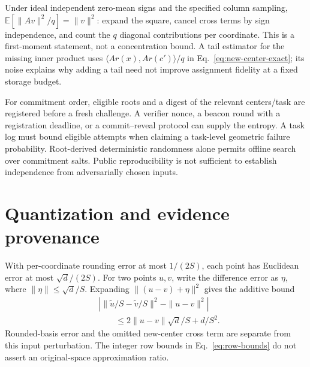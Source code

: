 \documentclass[5p,times,twocolumn]{elsarticle}
\theoremstyle{plain}
\theoremstyle{definition}
\theoremstyle{remark}
\begin{document}
\par\endgroup
\begingroup\color{RevisionRed}
Under ideal independent zero-mean signs and the specified column sampling, $\mathbb E[\|Av\|^2/q]=\|v\|^2$: expand the square, cancel cross terms by sign independence, and count the $q$ diagonal contributions per coordinate. This is a first-moment statement, not a concentration bound. A tail estimator for the missing inner product uses $\langle Ar(x),Ar(c')\rangle/q$ in Eq.~\eqref{eq:new-center-exact}; its noise explains why adding a tail need not improve assignment fidelity at a fixed storage budget.


\par\endgroup
\begingroup\color{RevisionRed}
For commitment order, eligible roots and a digest of the relevant centers/task are registered before a fresh challenge. A verifier nonce, a beacon round with a registration deadline, or a commit--reveal protocol can supply the entropy. A task log must bound eligible attempts when claiming a task-level geometric failure probability. Root-derived deterministic randomness alone permits offline search over commitment salts. Public reproducibility is not sufficient to establish independence from adversarially chosen inputs.


\par\endgroup
\section{\textcolor{RevisionRed}{Quantization and evidence provenance}}\label{app:configurations}
\begingroup\color{RevisionRed}
With per-coordinate rounding error at most $1/(2S)$, each point has Euclidean error at most $\sqrt d/(2S)$. For two points $u,v$, write the difference error as $\eta$, where $\|\eta\|\le\sqrt d/S$. Expanding $\|(u-v)+\eta\|^2$ gives the additive bound
\begin{equation}
\begin{aligned}
&\left|\|\widetilde u/S-\widetilde v/S\|^2-\|u-v\|^2\right|\\
&\qquad\le2\|u-v\|\sqrt d/S+d/S^2.
\end{aligned}
\end{equation}
Rounded-basis error and the omitted new-center cross term are separate from this input perturbation. The integer row bounds in Eq.~\eqref{eq:row-bounds} do not assert an original-space approximation ratio.
\end{document}
